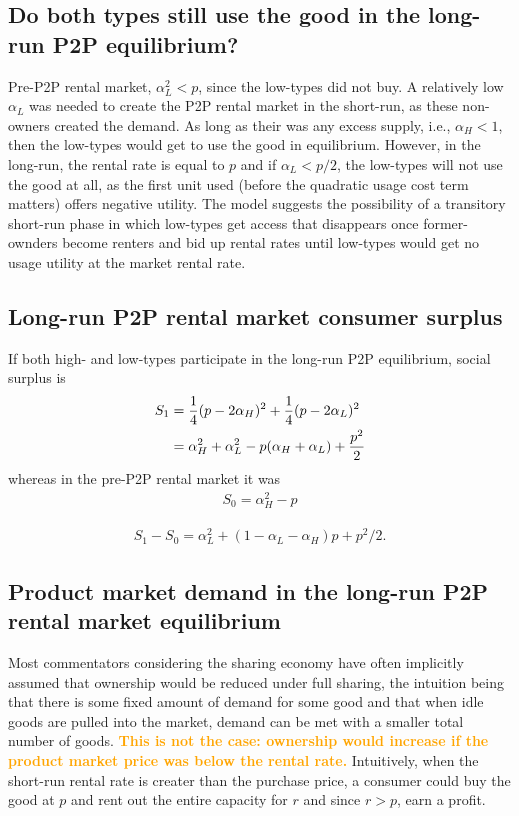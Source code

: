 \documentclass[11pt]{article}
\newcommand{\important}[1]{\textcolor{orange}{\textbf{#1}}}
\begin{document}
\subsection{Do both types still use the good in the long-run P2P equilibrium?}
Pre-P2P rental market, $\alpha_L^2 < p$, since the low-types did not buy. 
A relatively low $\alpha_L$ was needed to create the P2P rental market in the short-run, as these non-owners created the demand. 
As long as their was any excess supply, i.e., $\alpha_H < 1$, then the low-types would get to use the good in equilibrium. 
However, in the long-run, the rental rate is equal to $p$ and if $\alpha_L < p/2$, the low-types will not use the good at all, as the first unit used (before the quadratic usage cost term matters) offers negative utility. 
The model suggests the possibility of a transitory short-run phase in which low-types get access that disappears once former-ownders become renters and bid up rental rates until low-types would get no usage utility at the market rental rate. 

\subsection{Long-run P2P rental market consumer surplus} 
If both high- and low-types participate in the long-run P2P equilibrium, social surplus is 
\begin{align} 
S_1 & = \frac{1}{4}(p - 2\alpha_H)^2 + \frac{1}{4}(p - 2\alpha_L)^2 \notag \\
    & = \alpha_H^2 + \alpha_L^2 - p(\alpha_H + \alpha_L) + \frac{p^2}{2} \notag \\ 
\end{align} 
whereas in the pre-P2P rental market it was 
\begin{align}
S_0 = \alpha_H^2 - p 
\end{align} 

\begin{align}
S_1 - S_0 = \alpha_L^2 + (1 - \alpha_L - \alpha_H)p + p^2/2.  
\end{align} 

\subsection{Product market demand in the long-run P2P rental market equilibrium} 
Most commentators considering the sharing economy have often implicitly assumed that ownership would be reduced under full sharing, the intuition being that there is some fixed amount of demand for some good and that when idle goods are pulled into the market, demand can be met with a smaller total number of goods. 
\important{This is not the case:  
ownership would increase if the product market price was below the rental rate.} 
Intuitively, when the short-run rental rate is creater than the purchase price, a consumer could buy the good at $p$ and rent out the entire capacity for $r$ and since $r > p$, earn a profit. 
\end{document}

